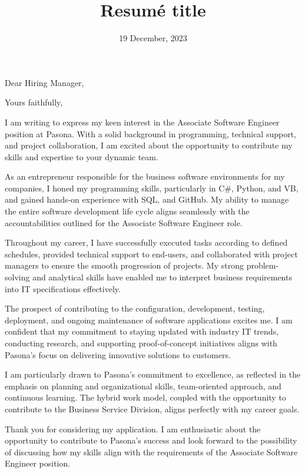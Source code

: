 \documentclass[11pt,a4paper,sans]{moderncv}        %
\title{Resumé title}                               %
\begin{document}
\date{19 December, 2023}
\opening{Dear Hiring Manager,}
\closing{Yours faithfully,}         %
\makelettertitle

I am writing to express my keen interest in the Associate Software Engineer position at Pasona. With a solid background in programming, technical support, and project collaboration, I am excited about the opportunity to contribute my skills and expertise to your dynamic team.

As an entrepreneur responsible for the business software environments for my companies, I honed my programming skills, particularly in C\#, Python, and VB, and gained hands-on experience with SQL, and GitHub. My ability to manage the entire software development life cycle aligns seamlessly with the accountabilities outlined for the Associate Software Engineer role.

Throughout my career, I have successfully executed tasks according to defined schedules, provided technical support to end-users, and collaborated with project managers to ensure the smooth progression of projects. My strong problem-solving and analytical skills have enabled me to interpret business requirements into IT specifications effectively.

The prospect of contributing to the configuration, development, testing, deployment, and ongoing maintenance of software applications excites me. I am confident that my commitment to staying updated with industry IT trends, conducting research, and supporting proof-of-concept initiatives aligns with Pasona's focus on delivering innovative solutions to customers.

I am particularly drawn to Pasona's commitment to excellence, as reflected in the emphasis on planning and organizational skills, team-oriented approach, and continuous learning. The hybrid work model, coupled with the opportunity to contribute to the Business Service Division, aligns perfectly with my career goals.

Thank you for considering my application. I am enthusiastic about the opportunity to contribute to Pasona's success and look forward to the possibility of discussing how my skills align with the requirements of the Associate Software Engineer position.

\makeletterclosing
\end{document}
